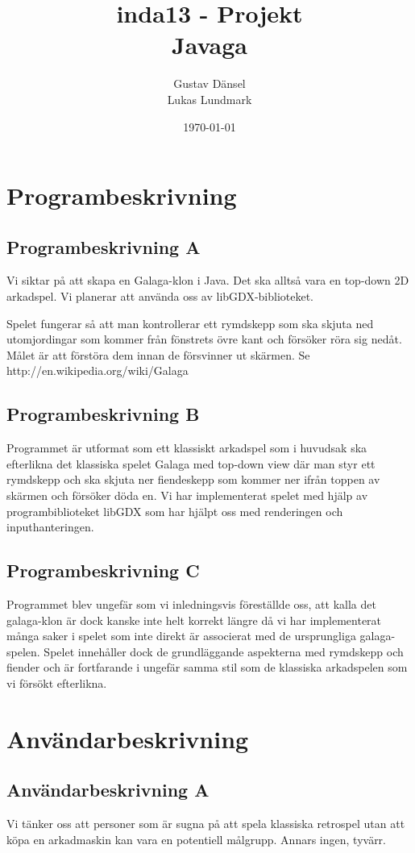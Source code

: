\documentclass[a4paper,11pt]{article}
\title{inda13 - Projekt \\
		Javaga}
\author{Gustav Dänsel \\ Lukas Lundmark }
\date{\today}
\begin{document}
\maketitle
\section{Programbeskrivning}
\subsection{Programbeskrivning A}
Vi siktar på att skapa en Galaga-klon i Java. Det ska alltså vara en top-down 2D arkadspel. Vi planerar att använda oss av libGDX-biblioteket. 

Spelet fungerar så att man kontrollerar ett rymdskepp som ska skjuta ned utomjordingar som kommer från fönstrets övre kant och försöker röra sig nedåt. Målet är att förstöra dem innan de försvinner ut skärmen. Se http://en.wikipedia.org/wiki/Galaga

\subsection{Programbeskrivning B}
Programmet är utformat som ett klassiskt arkadspel som i huvudsak ska efterlikna det klassiska spelet Galaga med top-down view där man styr ett rymdskepp och ska skjuta ner fiendeskepp som kommer ner ifrån toppen av skärmen och försöker döda en. Vi har implementerat spelet med hjälp av programbiblioteket libGDX som har hjälpt oss med renderingen och inputhanteringen.

\subsection{Programbeskrivning C}
Programmet blev ungefär som vi inledningsvis föreställde oss, att kalla det galaga-klon är dock kanske inte helt korrekt längre då vi har implementerat många saker i spelet som inte direkt är associerat med de ursprungliga galaga-spelen. Spelet innehåller dock de grundläggande aspekterna med rymdskepp och fiender och är fortfarande i ungefär samma stil som de klassiska arkadspelen som vi försökt efterlikna.

\section{Användarbeskrivning}
\subsection{Användarbeskrivning A}
Vi tänker oss att personer som är sugna på att spela klassiska retrospel utan att köpa en arkadmaskin kan vara en potentiell målgrupp. Annars ingen, tyvärr.
\end{document}
